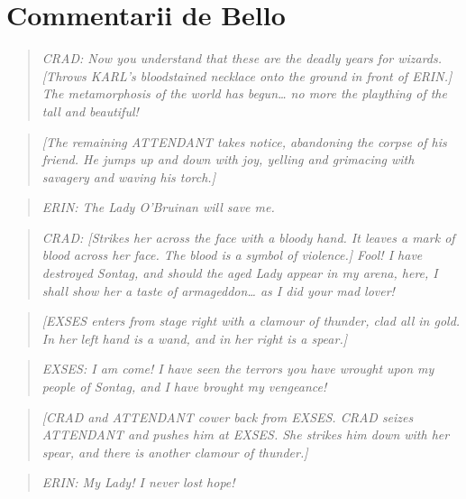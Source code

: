 \hypertarget{commentarii-de-bello}{%
\chapter{Commentarii de Bello}\label{commentarii-de-bello}}

\begin{quote}
\emph{CRAD: Now you understand that these are the deadly years for
wizards. {[}Throws KARL's bloodstained necklace onto the ground in front
of ERIN.{]} The metamorphosis of the world has begun\ldots{} no more the
plaything of the tall and beautiful!}
\end{quote}

\begin{quote}
\emph{{[}The remaining ATTENDANT takes notice, abandoning the corpse of
his friend. He jumps up and down with joy, yelling and grimacing with
savagery and waving his torch.{]}}
\end{quote}

\begin{quote}
\emph{ERIN: The Lady O'Bruinan will save me.}
\end{quote}

\begin{quote}
\emph{CRAD: {[}Strikes her across the face with a bloody hand. It leaves
a mark of blood across her face. The blood is a symbol of violence.{]}
Fool! I have destroyed Sontag, and should the aged Lady appear in my
arena, here, I shall show her a taste of armageddon\ldots{} as I did
your mad lover!}
\end{quote}

\begin{quote}
\emph{{[}EXSES enters from stage right with a clamour of thunder, clad
all in gold. In her left hand is a wand, and in her right is a
spear.{]}}
\end{quote}

\begin{quote}
\emph{EXSES: I am come! I have seen the terrors you have wrought upon my
people of Sontag, and I have brought my vengeance!}
\end{quote}

\begin{quote}
\emph{{[}CRAD and ATTENDANT cower back from EXSES. CRAD seizes ATTENDANT
and pushes him at EXSES. She strikes him down with her spear, and there
is another clamour of thunder.{]}}
\end{quote}

\begin{quote}
\emph{ERIN: My Lady! I never lost hope!}
\end{quote}

